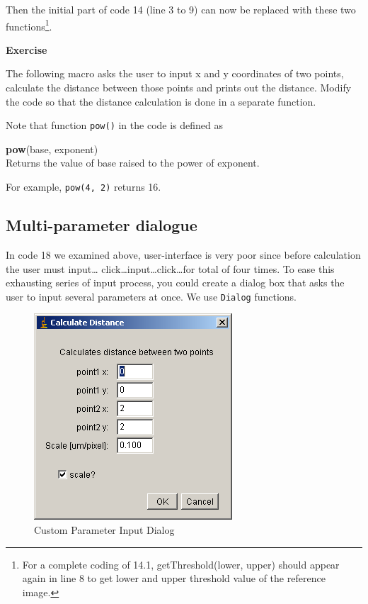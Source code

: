 \documentclass[11pt,a4paper,oneside]{report}
\newenvironment{indentexercise}[1]%
{{\setlength{\leftmargin}{2em}}%
\textbf{Exercise \thesubsection-#1}%
\begin{list}{}%
	\item%
}
{\end{list}}
\newenvironment{indentCom}%
{\begin{list}{}%
         {\setlength{\leftmargin}{1em}}%
         \item[]%
}
{\end{list}}
\newcommand{\ilcom}[1]{\texttt{\small#1}}
\begin{document}


Then the initial part of code 14 (line 3 to 9) can now be replaced with 
these two functions\footnote{For a complete coding of 14.1, 
getThreshold(lower, upper) should appear again in line 8 to get lower and upper threshold value 
of the reference image.}. 



\begin{indentexercise}{1}
The following macro asks the user to input x and y coordinates of two points, 
calculate the distance between those points and prints out the distance. 
Modify the code so that the distance calculation is done in a separate function. 



Note that function \ilcom{pow()} in the code is defined as
\begin{indentCom}
\textbf{pow}(base, exponent)\\
Returns the value of base raised to the power of exponent. 
\end{indentCom}
For example, \ilcom{pow(4, 2)} returns 16.
\end{indentexercise}

\subsection{Multi-parameter dialogue}
In code 18 we examined above, 
user-interface is very poor since before calculation the user must input\ldots 
click\ldots input\ldots click\ldots for total of four times. 
To ease this exhausting series of input process, 
you could create a dialog box that asks the user to input several parameters at once. 
We use \ilcom{Dialog} functions. 



\begin{figure}[htbp]
\begin{center}
\includegraphics[scale=0.6]{fig/fig2421_GenDialog.png}
\caption{Custom Parameter Input Dialog}
\label{figGenericDialog}
\end{center}
\end{figure} 
\end{document}
